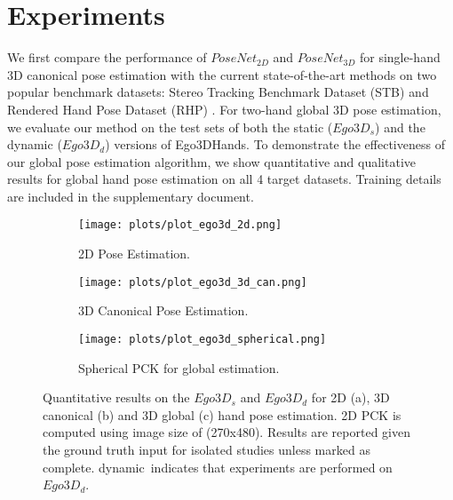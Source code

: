 \documentclass[10pt,twocolumn,letterpaper]{article}
\begin{document}
\section{Experiments}\label{sec:experiments}
\indent We first compare the performance of \textit{$PoseNet_{2D}$} and \textit{$PoseNet_{3D}$} for single-hand 3D canonical pose estimation with the current state-of-the-art methods on two popular benchmark datasets: Stereo Tracking Benchmark Dataset (STB) \cite{Zhang} and Rendered Hand Pose Dataset (RHP) \cite{Zimmermann}. For two-hand global 3D pose estimation, we evaluate our method on the test sets of both the static ($Ego3D_{s}$) and the dynamic ($Ego3D_{d}$) versions of Ego3DHands. To demonstrate the effectiveness of our global pose estimation algorithm, we show quantitative and qualitative results for global hand pose estimation on all 4 target datasets. Training details are included in the supplementary document.
\begin{figure*}[t]
 \centering
  \begin{subfigure}[t]{0.32\linewidth}
    \texttt{[image: plots/plot\_ego3d\_2d.png]}
    \caption{2D Pose Estimation.}\label{fig:ego3d_eval1}
  \end{subfigure}
  \begin{subfigure}[t]{0.32\linewidth}
    \texttt{[image: plots/plot\_ego3d\_3d\_can.png]}
    \caption{3D Canonical Pose Estimation.}\label{fig:ego3d_eval2}
  \end{subfigure}
  \begin{subfigure}[t]{0.32\linewidth}
    \texttt{[image: plots/plot\_ego3d\_spherical.png]}
    \caption{Spherical PCK for global estimation.}\label{fig:ego3d_eval3}
  \end{subfigure}
  \vspace{0.2cm}
  \caption{Quantitative results on the $Ego3D_{s}$ and $Ego3D_{d}$ for 2D (a), 3D canonical (b) and 3D global (c) hand pose estimation. 2D PCK is computed using image size of (270x480). Results are reported given the ground truth input for isolated studies unless marked as \textquotedbl *complete\textquotedbl {}. \textquotedbl dynamic\textquotedbl \ indicates that experiments are performed on $Ego3D_{d}$.}
\label{fig:ego3d_eval}
\end{figure*}
\end{document}
